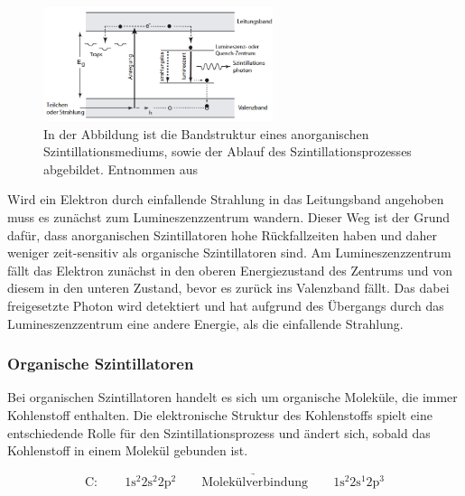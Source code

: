                 \FloatBarrier

                \begin{figure}[h]
                  \centering
                  \includegraphics[width = 0.6\textwidth]{pictures/Bandstruktur.png}
                  \caption{In der Abbildung ist die Bandstruktur eines anorganischen Szintillationsmediums, sowie der Ablauf des Szintillationsprozesses abgebildet. Entnommen aus \cite{kolanoski_teilchendetektoren_2016}}
                  \label{fig:Bandstruktur}
                \end{figure}
        
                \FloatBarrier
        
                \noindent

                Wird ein Elektron durch einfallende Strahlung in das Leitungsband angehoben muss es zunächst zum Lumineszenzzentrum wandern. Dieser Weg ist der Grund dafür, dass anorganischen Szintillatoren
                hohe Rückfallzeiten haben und daher weniger zeit-sensitiv als organische Szintillatoren sind. Am Lumineszenzzentrum fällt das Elektron zunächst in den oberen Energiezustand des Zentrums und
                von diesem in den unteren Zustand, bevor es zurück ins Valenzband fällt. Das dabei freigesetzte Photon wird detektiert und hat aufgrund des Übergangs durch das Lumineszenzzentrum eine andere 
                Energie, als die einfallende Strahlung.


            \subsubsection*{Organische Szintillatoren}
                Bei organischen Szintillatoren handelt es sich um organische Moleküle, die immer Kohlenstoff enthalten. Die elektronische Struktur des Kohlenstoffs spielt eine entschiedende Rolle für den
                Szintillationsprozess und ändert sich, sobald das Kohlenstoff in einem Molekül gebunden ist.

                \begin{equation*}
                    \text{C}: \qquad 1\text{s}^2 2\text{s}^2 2\text{p}^2 \qquad \underrightarrow{\text{Molekülverbindung}} \qquad 1\text{s}^2 2\text{s}^1 2\text{p}^3
                \end{equation*}


